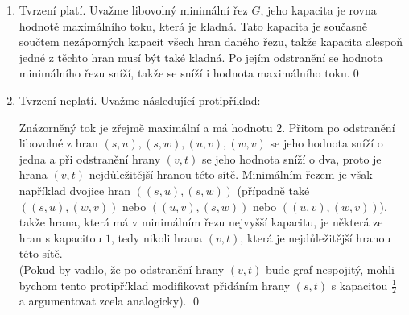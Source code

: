 \documentclass[12pt,a4paper]{article}
\theoremstyle{plain}
\begin{document}
\pagestyle{fancy}                      %
\fancyhf{}                             %
\addtolength{\topmargin}{-30 pt}                   %
\setlength{\headsep}{10 pt}                      %
\renewcommand{\headrulewidth}{1 pt}                %

\begin{enumerate}[1.]
\item
Tvrzení platí. Uvažme libovolný minimální řez $G$, jeho kapacita je rovna hodnotě maximálního toku, která je kladná. Tato kapacita je současně součtem nezáporných kapacit všech hran daného řezu, takže kapacita alespoň jedné z těchto hran musí být také kladná. Po jejím odstranění se hodnota minimálního řezu sníží, takže se sníží i hodnota maximálního toku.\qed
    
\item 
Tvrzení neplatí. Uvažme následující protipříklad:
\begin {center}
\end{center}
Znázorněný tok je zřejmě maximální a má hodnotu $2$. Přitom po odstranění libovolné z hran $(s,u),(s,w),(u,v),(w,v)$ se jeho hodnota sníží o jedna a při odstranění hrany $(v,t)$ se jeho hodnota sníží o dva, proto je hrana $(v,t)$ nejdůležitější hranou této sítě. Minimálním řezem je však například dvojice hran $((s,u),(s,w))$ (případně také $((s,u),(w,v))$ nebo $((u,v),(s,w))$ nebo $((u,v),(w,v))$), takže hrana, která má v minimálním řezu nejvyšší kapacitu, je některá ze hran s kapacitou $1$, tedy nikoli hrana $(v,t)$, která je nejdůležitější hranou této sítě.\\
(Pokud by vadilo, že po odstranění hrany $(v,t)$ bude graf nespojitý, mohli bychom tento protipříklad modifikovat přidáním hrany $(s,t)$ s kapacitou $\frac{1}{2}$ a argumentovat zcela analogicky).
\qed
\end{enumerate}
\end{document}
